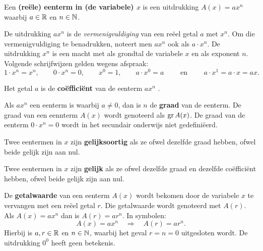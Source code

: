 \documentclass{ximera}
\begin{document}
\begin{definition} 
Een \textbf{(reële) eenterm in (de variabele) $x$} is een uitdrukking $A(x) = ax^n$ waarbij $a \in \mathbb{R}$ en $n \in \mathbb{N}$. 

De uitdrukking $ax^n$ is de \textit{ vermenigvuldiging} van een reëel getal $a$ met $x^n$. Om die vermenigvuldiging te benadrukken, noteert men $ax^n$  ook als $a \cdot x^n$. De uitdrukking $x^n$ is een macht met als grondtal de variabele $x$ en als exponent $n$. Volgende schrijfwijzen gelden wegens afspraak:
\[
1\cdot x^n = x^n, \qquad
0\cdot x^n = 0, \qquad  
x^0 = 1, \qquad 
a\cdot x^0 = a \qquad \text{ en } \qquad 
a\cdot x^1 = a \cdot x = ax.
\]

Het getal $a$ is de \textbf{coëfficiënt} van de eenterm $ax^n$ .

Als $ax^n$ een eenterm is waarbij $a \neq 0$, dan is $n$ de \textbf{graad} van de eenterm. De graad van een eennterm \(A(x)\) wordt genoteerd als $\operatorname{gr} A(x)$. De graad van de eenterm $0\cdot x^n = 0$ wordt in het secundair onderwijs niet gedefiniëerd.


Twee eentermen in $x$ zijn \textbf{gelijksoortig} als ze ofwel dezelfde graad hebben, ofwel beide gelijk zijn aan nul.

Twee eentermen in $x$ zijn \textbf{gelijk} als ze ofwel dezelfde graad en dezelfde coëfficiënt hebben, ofwel beide gelijk zijn aan nul.


De \textbf{getalwaarde} van een eenterm $A(x)$ wordt bekomen door de variabele $x$ te vervangen met een reëel getal $r$. Die getalwaarde wordt genoteerd met $A(r)$. Als $A(x) = ax^n$ dan is $A(r) = ar^n$. In symbolen:
\[
A(x) = ax^n \quad \Rightarrow \quad A(r) = a r^n.
\]
Hierbij is $a,r \in \mathbb{R}$ en $n \in \mathbb{N}$, waarbij het geval $r = n = 0$ uitgesloten wordt. De uitdrukking $0^0$ heeft geen betekenis.


\end{definition} 


\end{document}
